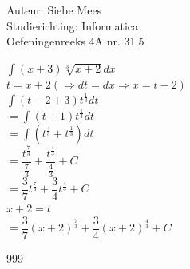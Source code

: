 \documentclass[a4paper]{article}
\begin{document}
  
\noindent \large Auteur: Siebe Mees \\
\noindent \large Studierichting: Informatica\\
\noindent \large Oefeningenreeks 4A nr. 31.5\\

\medskip

\normalsize

$\displaystyle\int (x+3)\sqrt[3]{x+2}dx$\\

$t=x+2 \left( \Rightarrow dt=dx \Rightarrow x=t-2 \right)$\\

$\displaystyle\int (t-2+3)t^{\tfrac{1}{3}}dt$\\

$=\displaystyle\int (t+1)t^{\tfrac{1}{3}}dt$\\

$=\displaystyle\int \left(t^{\tfrac{4}{3}}+t^{\tfrac{1}{3}}\right)dt$\\

$=\dfrac{t^{\tfrac{7}{3}}}{\tfrac{7}{3}}+\dfrac{t^{\tfrac{4}{3}}}{\tfrac{4}{3}}+C$\\

$=\dfrac{3}{7}t^{\tfrac{7}{3}}+\dfrac{3}{4}t^{\tfrac{4}{3}}+C$\\

$x+2=t$\\

$=\dfrac{3}{7}(x+2)^{\tfrac{7}{3}}+\dfrac{3}{4}(x+2)^{\tfrac{4}{3}}+C$\\

\begin{thebibliography}{999}
\end{thebibliography}
\end{document}
